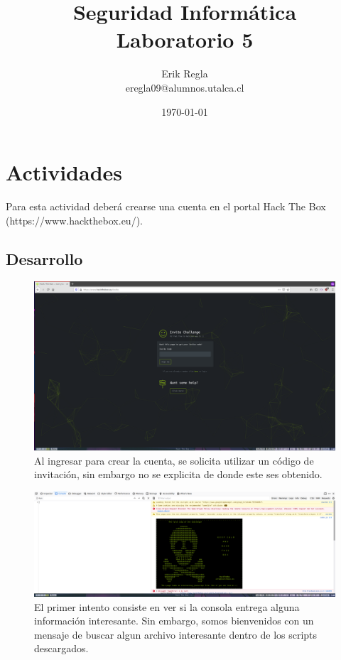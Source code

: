\documentclass[11pt]{utalcaDoc}
\title{{\bf Seguridad Informática}\\ Laboratorio 5}
\author{Erik Regla\\ eregla09@alumnos.utalca.cl}
\date{\today}
\begin{document}
\maketitle
\newpage
\tableofcontents
\newpage

\section{Actividades}
Para esta actividad deberá crearse una cuenta en el portal Hack The Box
(https://www.hackthebox.eu/).

\subsection[Desarrollo]{Desarrollo}



\begin{figure}[H]
	\centering
	\includegraphics[width=.9\textwidth]{images/01.png}
	\caption{Al ingresar para crear la cuenta, se solicita utilizar un código de invitación, sin embargo no se explicita de donde este ses obtenido.}
\end{figure}
\begin{figure}[H]
	\centering
	\includegraphics[width=.9\textwidth]{images/02.png}
	\caption{El primer intento consiste en ver si la consola entrega alguna información interesante. Sin embargo, somos bienvenidos con un mensaje de buscar algun archivo interesante dentro de los scripts descargados.}
\end{figure}
\end{document}

